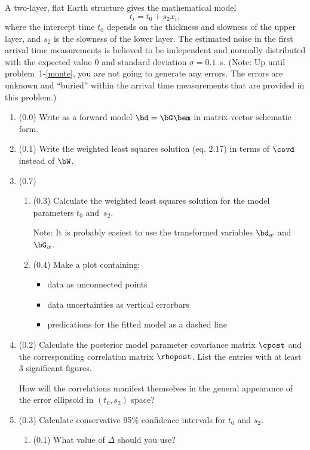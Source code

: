 \documentclass[11pt,titlepage,fleqn]{article}
\begin{document}
A two-layer, flat Earth structure gives the mathematical model
%
\begin{equation}
t_i = t_0 + s_2x_i,
\label{twolayer}
\end{equation}
%
where the intercept time $t_0$ depends on the thickness and slowness of the upper layer, and $s_2$ is the slowness of the lower layer. The estimated noise in the first arrival time measurements is believed to be independent and normally distributed with the expected value 0 and standard deviation $\sigma = 0.1$~s. (Note: Up until problem~1-\ref{monte}, you are not going to generate any errors. The errors are unknown and ``buried'' within the arrival time measurements that are provided in this problem.)
%
\begin{enumerate}
\item (0.0) Write  as a forward model $\bd = \bG\bem$ in matrix-vector schematic form.

\item (0.1) Write the weighted least squares solution (eq. 2.17) in terms of $\covd$ instead of $\bW$.

\item (0.7) 
\begin{enumerate}
\item (0.3) Calculate the weighted least squares solution for the model parameters $t_0$ and~$s_2$.

Note: It is probably easiest to use the transformed variables $\bd_w$ and $\bG_w$.
\item (0.4) Make a plot containing:
%
\begin{itemize}
\item data as unconnected points
\item data uncertainties as vertical errorbars
\item predications for the fitted model as a dashed line
\end{itemize}

\end{enumerate}


\item (0.2) Calculate the posterior model parameter covariance matrix $\cpost$ and the corresponding correlation matrix $\rhopost$. List the entries with at least 3 significant figures.

How will the correlations manifest themselves in the general appearance of the error ellipsoid in $(t_0,s_2)$ space?

\pagebreak
\item (0.3) Calculate conservative 95\% confidence intervals for $t_0$ and $s_2$.
%
\begin{enumerate}
\item (0.1) What value of $\Delta$ should you use?


\end{enumerate}
\end{enumerate}
\end{document}
